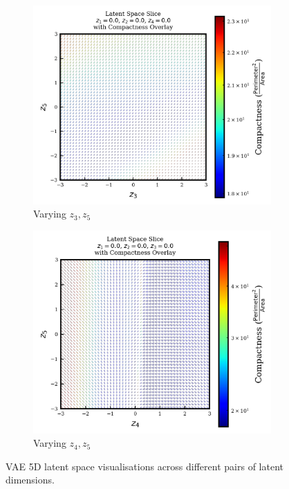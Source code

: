 \documentclass{article}
\begin{document}
\begin{figure}[H]
    \vspace{0.5em}
    
    \begin{subfigure}{0.45\textwidth}
        \includegraphics[width=\linewidth]{figures/VAEmodels/model4/varying_z3_z5_fixed_z1=0.0_z2=0.0_z4=0.0.png}
        \caption{Varying $z_3, z_5$}
    \end{subfigure}
    \hfill
    \begin{subfigure}{0.45\textwidth}
        \includegraphics[width=\linewidth]{figures/VAEmodels/model4/varying_z4_z5_fixed_z1=0.0_z2=0.0_z3=0.0.png}
        \caption{Varying $z_4, z_5$}
    \end{subfigure}

    \caption{VAE 5D latent space visualisations across different pairs of latent dimensions.}
    \label{fig:vae_model4}
\end{figure}
\end{document}
